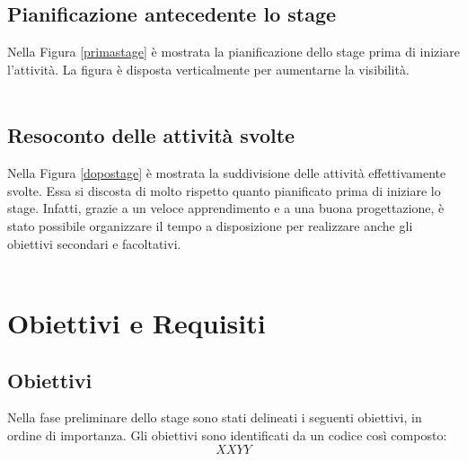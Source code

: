 \subsection{Pianificazione antecedente lo stage}
Nella Figura \ref{primastage} è mostrata la pianificazione dello stage prima di iniziare l'attività. La figura è disposta verticalmente per aumentarne la visibilità.
\\
\\

\newpage

\subsection{Resoconto delle attività svolte}
Nella Figura \ref{dopostage} è mostrata la suddivisione delle attività effettivamente svolte. Essa si discosta di molto rispetto quanto pianificato prima di iniziare lo stage. Infatti, grazie a un veloce apprendimento e a una buona progettazione, è stato possibile organizzare il tempo a disposizione per realizzare anche gli obiettivi secondari e facoltativi.
\\
\\
\newpage

\section{Obiettivi e Requisiti}

\subsection{Obiettivi}
Nella fase preliminare dello stage sono stati delineati i seguenti obiettivi, in ordine di importanza. Gli obiettivi sono identificati da un codice così composto:
$$ XXYY $$

